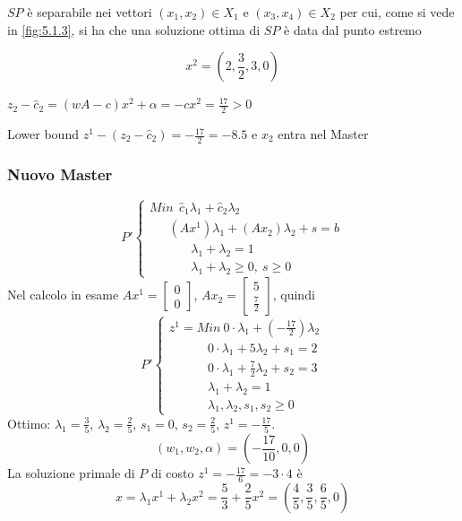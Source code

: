 $SP$ è separabile nei vettori $(x_{1},x_{2})\in X_{1}$ e $(x_{3},x_{4})\in X_{2}$ per cui, come si vede in \ref{fig:5.1.3}, si ha che una soluzione ottima di $SP$ è data dal punto estremo

\begin{equation*}
	x^{2}=(2,\frac{3}{2},3,0)
\end{equation*}

$z_{2}-\hat{c}_{2}=(w A-c)x^{2}+\alpha=-cx^{2}=\frac{17}{2}>0$

Lower bound $z^{1}-(z_{2}-\hat{c}_{2})=-\frac{17}{2}=-8.5$ e $x_{2}$ entra nel Master

\clearpage
\subsubsection{Nuovo Master}
\begin{equation*}
	P'
	\begin{cases}
		Min\ \ \hat{c}_{1}\lambda_{1}+\hat{c}_{2}\lambda_{2}\\
		\ \ \ \ \ \ \ (Ax^{1})\lambda_{1}+(Ax_{2})\lambda_{2}+s=b \\
		\ \ \ \ \ \ \ \ \ \ \ \ \ \ \ \lambda_{1}+\lambda_{2}=1 \\
		\ \ \ \ \ \ \ \ \ \ \ \ \ \ \ \lambda_{1}+\lambda_{2}\ge 0,\ s\ge 0
	\end{cases}
\end{equation*}
Nel calcolo in esame $Ax^{1}=\begin{bmatrix}0\\0\end{bmatrix}$, $Ax_{2}=\begin{bmatrix}5\\\frac{7}{2}\end{bmatrix}$, quindi
\begin{equation*}
	P'
	\begin{cases}
		z^{1}=Min\ 0\cdot\lambda_{1}+(-\frac{17}{2})\lambda_{2} \\
		\ \ \ \ \ \ \ \ \ \ \ \ \ \ 0\cdot\lambda_{1}+5\lambda_{2}+s_{1}=2 \\
		\ \ \ \ \ \ \ \ \ \ \ \ \ \ 0\cdot\lambda_{1}+\frac{7}{2}\lambda_{2}+s_{2}=3 \\
		\ \ \ \ \ \ \ \ \ \ \ \ \ \ \lambda_{1}+\lambda_{2}=1 \\
		\ \ \ \ \ \ \ \ \ \ \ \ \ \ \lambda_{1},\lambda_{2},s_{1},s_{2}\ge 0
	\end{cases}
\end{equation*}
Ottimo: $\lambda_{1}=\frac{3}{5}$, $\lambda_{2}=\frac{2}{5}$, $s_{1}=0$, $s_{2}=\frac{2}{5}$, $z^{1}=-\frac{17}{5}$.
\begin{equation*}
	(w_{1},w_{2},\alpha)=(-\frac{17}{10},0,0)
\end{equation*}
La soluzione primale di $P$ di costo $z^{1}=-\frac{17}{6}=-3\cdot 4$ è
\begin{equation*}
	x=\lambda_{1}x^{1}+\lambda_{2}x^{2}=\frac{5}{3}+\frac{2}{5}x^{2}=(\frac{4}{5},\frac{3}{5},\frac{6}{5},0)
\end{equation*}

